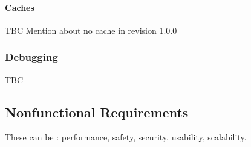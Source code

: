 \paragraph{Caches}

\begin{content}
  TBC Mention about no cache in revision 1.0.0
\end{content}

\subsubsection{Debugging}

\begin{content}
    TBC
\end{content}

\subsection{Nonfunctional Requirements}



\begin{content}
These can be : performance, safety, security, usability, scalability.
\end{content}

\newpage

